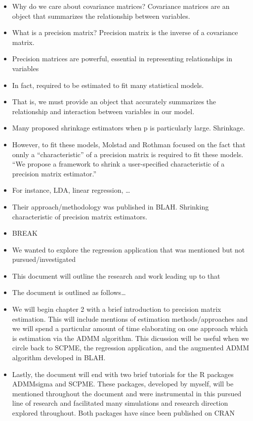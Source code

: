 \documentclass[11pt,]{report}
\begin{document}
\begin{itemize}
\item
  Why do we care about covariance matrices? Covariance matrices are an object that summarizes the relationship between variables.
\item
  What is a precision matrix? Precision matrix is the inverse of a covariance matrix.
\item
  Precision matrices are powerful, essential in representing relationships in variables
\item
  In fact, required to be estimated to fit many statistical models.
\item
  That is, we must provide an object that accurately summarizes the relationship and interaction between variables in our model.
\item
  Many proposed shrinkage estimators when p is particularly large. Shrinkage.
\item
  However, to fit these models, Molstad and Rothman focused on the fact that onnly a ``characteristic'' of a precision matrix is required to fit these models. ``We propose a framework to shrink a user-specified characteristic of a precision matrix estimator.''
\item
  For instance, LDA, linear regression, \ldots{}
\item
  Their approach/methodology was published in BLAH. Shrinking characteristic of precision matrix estimators.
\item
  BREAK
\item
  We wanted to explore the regression application that was mentioned but not pursued/investigated
\item
  This document will outline the research and work leading up to that
\item
  The document is outlined as follows\ldots{}
\item
  We will begin chapter 2 with a brief introduction to precision matrix estimation. This will include mentions of estimation methods/approaches and we will spend a particular amount of time elaborating on one approach which is estimation via the ADMM algorithm. This dicussion will be useful when we circle back to SCPME, the regression application, and the augmented ADMM algorithm developed in BLAH.
\item
  Lastly, the document will end with two brief tutorials for the R packages ADMMsigma and SCPME. These packages, developed by myself, will be mentioned throughout the document and were instrumental in this pursued line of research and facilitated many simulations and research direction explored throughout. Both packages have since been published on CRAN
\end{itemize}
\end{document}
